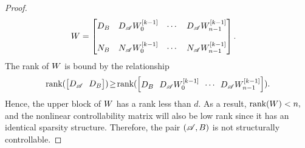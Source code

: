 \documentclass[10pt,a4paper]{amsart}
\newcommand{\rank}{\text{rank}}
\begin{document}
\begin{proof}
\begin{equation*}
    \begin{split}
        \textbf W&=\begin{bmatrix}
            \textbf D_\textbf B 
        & \textbf D_\mathscr A\textbf W_0^{[k-1]}&\cdots&\textbf D_\mathscr A\textbf W_{n-1}^{[k-1]}\\
            &&\\
            \textbf N_\textbf B & \textbf N_\mathscr A \textbf W_0^{[k-1]}&\cdots&\textbf N_\mathscr A\textbf W_{n-1}^{[k-1]}\\
        \end{bmatrix}.
    \end{split}
    \end{equation*}
    The rank of $\textbf W$ is bound by the relationship
    \begin{equation*}
    \rank(\begin{bmatrix}
            \textbf D_\mathscr A\!&\!\textbf D_\textbf B
    \end{bmatrix})\!\geq\!    \rank(\begin{bmatrix}\textbf D_\textbf B \!&\! \textbf D_\mathscr A\textbf W_0^{[k-1]} \!&\!\cdots\!&\!\textbf D_\mathscr A\textbf W_{n-1}^{[k-1]}\end{bmatrix}).
    \end{equation*}
    Hence, the upper block of $\textbf W$ has a rank less than $d.$ As a result, $\rank(\textbf W)<n,$ and the nonlinear controllability matrix will also be low rank since it has an identical sparsity structure. Therefore, the pair $(\mathscr A,\textbf B)$ is not structurally controllable. 
    

\end{proof}
\end{document}
